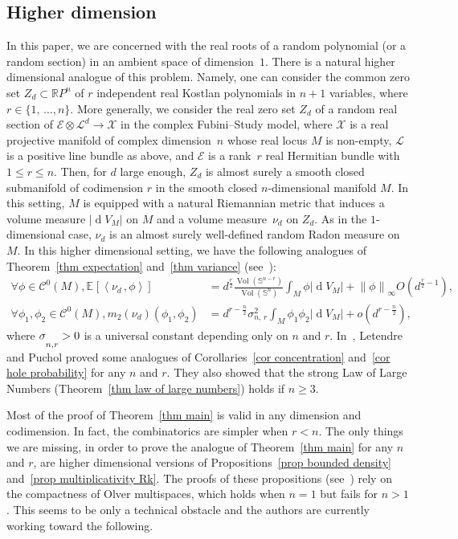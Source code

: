 \documentclass[10pt]{amsart}
\theoremstyle{definition}\newtheorem{defi}[theo]{Definition}\newtheorem{rema}[theo]{Remark}\newtheorem{exam}[theo]{Example}\newtheorem{exem}[theo]{Example}\newtheorem{nota}[theo]{Notation}
\DeclareMathOperator{\dmesure}{d}
\DeclareMathOperator{\Vol}{Vol}
\newcommand{\E}{\mathcal{E}}
\newcommand{\X}{\mathcal{X}}
\renewcommand{\L}{\mathcal{L}}
\newcommand{\clC}{\mathcal{C}}
\newcommand{\R}{\mathbb{R}}
\renewcommand{\S}{\mathbb{S}}
\newcommand{\esp}[2][]{\mathbb{E}_{#1}\!\left[#2 \right]}
\newcommand{\norm}[1]{\left\lvert #1 \right\rvert}
\newcommand{\Norm}[1]{\left\lVert #1 \right\rVert}
\newcommand{\prsc}[2]{\left\langle #1\,, #2 \right\rangle}
\newcommand{\rmes}[1]{\norm{\dmesure\! V_{#1}}}
\newcommand{\vol}[1]{\Vol\!\left(#1\right)}
\renewcommand{\geq}{\geqslant}
\renewcommand{\leq}{\leqslant}
\let\oldforall\forall
\renewcommand*{\forall}{\mathrel{\oldforall}}
\begin{document}
\subsection*{Higher dimension}

In this paper, we are concerned with the real roots of a random polynomial (or a random section) in an ambient space of dimension~$1$. There is a natural higher dimensional analogue of this problem. Namely, one can consider the common zero set $Z_d \subset \R P^n$ of $r$ independent real Kostlan polynomials in $n+1$ variables, where $r \in \{1,\,\dots,n\}$. More generally, we consider the real zero set $Z_d$ of a random real section of $\E \otimes \L^d \to \X$ in the complex Fubini--Study model, where $\X$ is a real projective manifold of complex dimension~$n$ whose real locus $M$ is non-empty, $\L$ is a positive line bundle as above, and $\E$ is a rank~$r$ real Hermitian bundle with $1 \leq r \leq n$. Then, for $d$ large enough, $Z_d$ is almost surely a smooth closed submanifold of codimension $r$ in the smooth closed $n$-dimensional manifold $M$. In this setting, $M$ is equipped with a natural Riemannian metric that induces a volume measure $\rmes{M}$ on $M$ and a volume measure~$\nu_d$ on $Z_d$. As in the $1$-dimensional case, $\nu_d$ is an almost surely well-defined random Radon measure on $M$. In this higher dimensional setting, we have the following analogues of Theorem~\ref{thm expectation} and~\ref{thm variance} (see~\cite{Let2016,Let2019,LP2019}):
\begin{align*}
\forall \phi \in \clC^0(M),  \esp{\prsc{\nu_d}{\phi}} &= d^\frac{r}{2} \frac{\vol{\S^{n-r}}}{\vol{\S^n}} \int_{M}\phi \rmes{M} + \Norm{\phi}_\infty O\left(d^{\frac{r}{2}-1}\right),\\
\forall \phi_1,\phi_2 \in \clC^0(M),  m_2(\nu_d)(\phi_1,\phi_2) &= d^{r -\frac{n}{2}} \sigma_{n,\,r}^2 \int_M \phi_1\phi_2 \rmes{M} + o\left(d^{r-\frac{n}{2}}\right),
\end{align*}
where $\sigma_{n,\rule{0pt}{10pt}r}>0$ is a universal constant depending only on $n$ and $r$. In~\cite{LP2019}, Letendre and Puchol proved some analogues of Corollaries~\ref{cor concentration} and~\ref{cor hole probability} for any $n$ and $r$. They also showed that the strong Law of Large Numbers (Theorem~\ref{thm law of large numbers}) holds if $n \geq 3$.

Most of the proof of Theorem~\ref{thm main} is valid in any dimension and codimension. In fact, the combinatorics are simpler when $r<n$. The only things we are missing, in order to prove the analogue of Theorem~\ref{thm main} for any $n$ and $r$, are higher dimensional versions of Propositions~\ref{prop bounded density} and~\ref{prop multiplicativity Rk}. The proofs of these propositions (see~\cite{Anc2019}) rely on the compactness of Olver multispaces, which holds when $n=1$ but fails for $n>1$. This seems to be only a technical obstacle and the authors are currently working toward the following.
\end{document}
